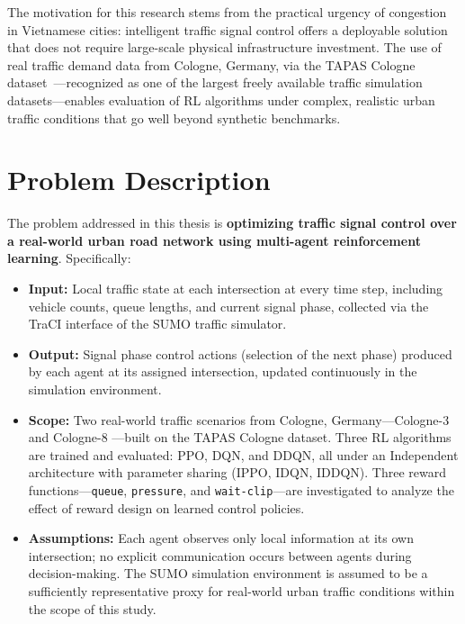The motivation for this research stems from the practical urgency of congestion in
Vietnamese cities: intelligent traffic signal control offers a deployable solution
that does not require large-scale physical infrastructure investment. The use of
real traffic demand data from Cologne, Germany, via the TAPAS Cologne
dataset~\cite{tapas_cologne_sumo}---recognized as one of the largest freely
available traffic simulation datasets---enables evaluation of RL algorithms under
complex, realistic urban traffic conditions that go well beyond synthetic benchmarks.

\section{Problem Description}

The problem addressed in this thesis is \textbf{optimizing traffic signal control
over a real-world urban road network using multi-agent reinforcement learning}.
Specifically:

\begin{itemize}
    \item \textbf{Input:} Local traffic state at each intersection at every time
    step, including vehicle counts, queue lengths, and current signal phase,
    collected via the TraCI interface of the SUMO traffic simulator.

    \item \textbf{Output:} Signal phase control actions (selection of the next
    phase) produced by each agent at its assigned intersection, updated
    continuously in the simulation environment.

    \item \textbf{Scope:} Two real-world traffic scenarios from Cologne,
    Germany---Cologne-3 and Cologne-8 ---built on the TAPAS Cologne dataset. Three RL
    algorithms are trained and evaluated: PPO, DQN, and DDQN, all under an
    Independent architecture with parameter sharing (IPPO, IDQN, IDDQN). Three
    reward functions---\texttt{queue}, \texttt{pressure}, and
    \texttt{wait-clip}---are investigated to analyze the effect of reward design
    on learned control policies.

    \item \textbf{Assumptions:} Each agent observes only local information at its
    own intersection; no explicit communication occurs between agents during
    decision-making. The SUMO simulation environment is assumed to be a
    sufficiently representative proxy for real-world urban traffic conditions
    within the scope of this study.
\end{itemize}

